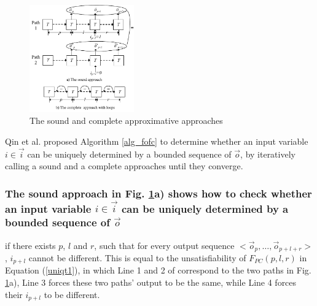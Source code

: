\documentclass[conference]{IEEEtran}
\begin{document}
\begin{figure}[t]
\begin{center}
\includegraphics[width=0.4\textwidth]{pc}
\end{center}
\caption{The sound and complete approximative approaches}
  \label{fig_pc}
\end{figure}

Qin et al. \cite{QinTODAES15} proposed Algorithm \ref{alg_fofc}
to determine whether an input variable $i\in\vec{i}$ can be uniquely determined by a bounded sequence of $\vec{o}$,
by iteratively calling 
a sound and a complete approaches until they converge.

\subsubsection{The sound approach in Fig. \ref{fig_pc}a) shows how to check whether
an input variable $i\in\vec{i}$ can be uniquely determined by a bounded sequence of $\vec{o}$}\label{subsub_sound}
if there exists $p$, $l$ and $r$,
such that for every output sequence $<\vec{o}_p,\dots,\vec{o}_{p+l+r}>$,
$i_{p+l}$ cannot be different.
This is equal to the unsatisfiability of $F_{PC}(p,l,r)$ in Equation (\ref{uniqt1}),
in which Line 1 and 2 of correspond to the two paths in Fig. \ref{fig_pc}a),
Line 3 forces these two paths' output to be the same,
while Line 4 forces their $i_{p+l}$ to be different.
\end{document}
